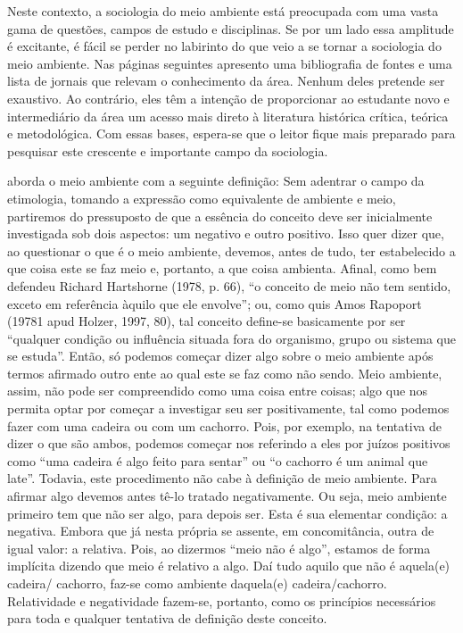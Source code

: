 Neste contexto, a sociologia do meio ambiente está preocupada com uma vasta gama de questões, campos de estudo e disciplinas. Se por um lado essa amplitude é excitante, é fácil se perder no labirinto do que veio a se tornar a sociologia do meio ambiente. Nas páginas seguintes apresento uma bibliografia de fontes e uma lista de jornais que relevam o conhecimento da área. Nenhum deles pretende ser exaustivo. Ao contrário, eles têm a intenção de proporcionar ao estudante novo e intermediário da área um acesso mais direto à literatura histórica crítica, teórica e metodológica. Com essas bases, espera-se que o leitor fique mais preparado para pesquisar este crescente e importante campo da sociologia.

 aborda o meio ambiente com a seguinte definição:
Sem adentrar o campo da etimologia, tomando a expressão como equivalente de
ambiente e meio, partiremos do pressuposto de que a essência do conceito deve ser inicialmente
investigada sob dois aspectos: um negativo e outro positivo. Isso quer dizer que, ao
questionar o que é o meio ambiente, devemos, antes de tudo, ter estabelecido a que coisa
este se faz meio e, portanto, a que coisa ambienta. Afinal, como bem defendeu Richard
Hartshorne (1978, p. 66), “o conceito de meio não tem sentido, exceto em referência
àquilo que ele envolve”; ou, como quis Amos Rapoport (19781 apud Holzer, 1997, 80), tal
conceito define-se basicamente por ser “qualquer condição ou influência situada fora do
organismo, grupo ou sistema que se estuda”. Então, só podemos começar dizer algo sobre
o meio ambiente após termos afirmado outro ente ao qual este se faz como não sendo.
Meio ambiente, assim, não pode ser compreendido como uma coisa entre coisas; algo que
nos permita optar por começar a investigar seu ser positivamente, tal como podemos fazer
com uma cadeira ou com um cachorro. Pois, por exemplo, na tentativa de dizer o que são ambos, podemos começar nos referindo a eles por juízos positivos como “uma cadeira é
algo feito para sentar” ou “o cachorro é um animal que late”. Todavia, este procedimento
não cabe à definição de meio ambiente. Para afirmar algo devemos antes tê-lo tratado negativamente.
Ou seja, meio ambiente primeiro tem que não ser algo, para depois ser. Esta
é sua elementar condição: a negativa. Embora que já nesta própria se assente, em concomitância,
outra de igual valor: a relativa. Pois, ao dizermos “meio não é algo”, estamos de
forma implícita dizendo que meio é relativo a algo. Daí tudo aquilo que não é aquela(e) cadeira/
cachorro, faz-se como ambiente daquela(e) cadeira/cachorro. Relatividade e negatividade
fazem-se, portanto, como os princípios necessários para toda e qualquer tentativa
de definição deste conceito.

